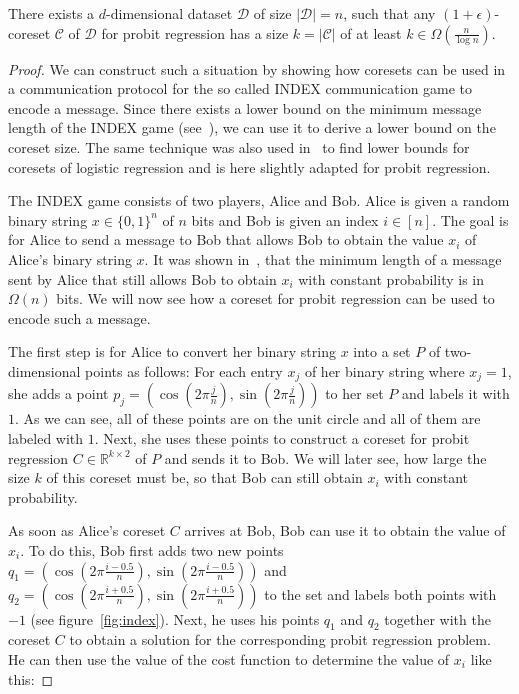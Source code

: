 \begin{theorem}
    There exists a $d$-dimensional dataset $\mathcal{D}$ of size
    $|\mathcal{D}| = n$, such
    that any $(1+\epsilon)$-coreset $\mathcal{C}$ of $\mathcal{D}$
    for probit regression has a size $k = |\mathcal{C}|$
    of at least $k \in \Omega\left(\frac{n}{\log{n}}\right)$.
\end{theorem}
\begin{proof}
    We can construct such a situation by showing
    how coresets can be used in a
    communication protocol for the so called INDEX communication game
    to encode a message.
    Since there exists a lower bound on the minimum
    message length of the INDEX game (see~\cite{index}),
    we can use it to derive a lower bound on the
    coreset size.
    The same technique was also used in~\cite{on-coresets} to find
    lower bounds for coresets of logistic regression and is here slightly
    adapted for probit regression.

    The INDEX game consists of two players, Alice and Bob.
    Alice is given a random binary string $x \in \{0, 1\}^n$ of $n$ bits
    and Bob is given an index $i \in [n]$.
    The goal is for Alice to send a message to Bob that allows
    Bob to obtain the value $x_i$ of Alice's binary string $x$.
    It was shown in~\cite{index}, that the minimum length of a message
    sent by Alice that still allows Bob to obtain $x_i$ with
    constant probability is in $\Omega(n)$ bits.
    We will now see how a coreset for probit regression can be used
    to encode such a message.

    The first step is for Alice to convert her binary string $x$ into
    a set $P$ of two-dimensional points as follows:
    For each entry $x_j$ of her binary string where $x_j = 1$, she adds
    a point $p_j = \left( \cos{\left(2 \pi \frac{j}{n}\right)},
        \sin{\left(2 \pi \frac{j}{n}\right)} \right)$
    to her set $P$ and labels it with $1$.
    As we can see, all of these points are on the unit circle and all
    of them are labeled with $1$.
    Next, she uses these points to construct a coreset for probit regression
    $C \in \mathbb{R}^{k \times 2}$ of $P$
    and sends it to Bob. We will later see, how
    large the size $k$ of this coreset must be, so that Bob can still
    obtain $x_i$ with constant probability.

    As soon as Alice's coreset $C$ arrives at Bob, Bob can use it to
    obtain the value of $x_i$.
    To do this, Bob first adds two new points
    $q_1 = \left( \cos{\left(2 \pi \frac{i - 0.5}{n}\right)},
        \sin{\left(2 \pi \frac{i - 0.5}{n}\right)} \right)$
    and
    $q_2 = \left( \cos{\left(2 \pi \frac{i + 0.5}{n}\right)},
        \sin{\left(2 \pi \frac{i + 0.5}{n}\right)} \right)$
    to the set and labels both points with $-1$ (see figure~\ref{fig:index}).
    Next, he uses his points $q_1$ and $q_2$ together with the coreset $C$ to
    obtain a solution for the corresponding probit regression problem.
    He can then use the value of the cost function to determine the value
    of $x_i$ like this:


\end{proof}
